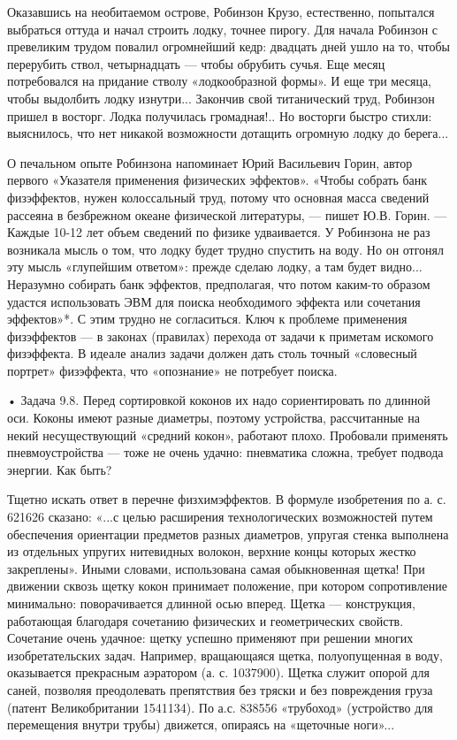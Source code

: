 Оказавшись  на  необитаемом   острове,  Робинзон  Крузо,  естественно,
попытался выбраться оттуда  и начал строить лодку,  точнее пирогу. Для
начала Робинзон с превеликим трудом повалил огромнейший кедр: двадцать
дней ушло на то, чтобы перерубить ствол, четырнадцать — чтобы обрубить
сучья.  Еще  месяц  потребовался  на  придание  стволу  «лодкообразной
формы». И  еще три месяца,  чтобы выдолбить лодку  изнутри... Закончив
свой титанический  труд, Робинзон  пришел в восторг.  Лодка получилась
громадная!.. Но  восторги быстро  стихли: выяснилось, что  нет никакой
возможности дотащить огромную лодку до берега...

О печальном  опыте Робинзона  напоминает Юрий Васильевич  Горин, автор
первого  «Указателя применения  физических  эффектов». «Чтобы  собрать
банк физэффектов,  нужен колоссальный труд, потому  что основная масса
сведений рассеяна  в безбрежном океане физической  литературы, — пишет
Ю.В. Горин. — Каждые 10-12 лет объем сведений по физике удваивается. У
Робинзона  не  раз возникала  мысль  о  том,  что лодку  будет  трудно
спустить на воду. Но он  отгонял эту мысль «глупейшим ответом»: прежде
сделаю лодку, а  там будет видно... Неразумно  собирать банк эффектов,
предполагая, что  потом каким-то образом удастся  использовать ЭВМ для
поиска необходимого эффекта или сочетания эффектов»*. С этим трудно не
согласиться.  Ключ  к  проблеме  применения физэффектов  —  в  законах
(правилах) перехода от задачи к приметам искомого физэффекта. В идеале
анализ задачи должен дать столь точный «словесный портрет» физэффекта,
что «опознание» не потребует поиска.


•  Задача  9.8.  Перед  сортировкой  коконов  их  надо  сориентировать
по  длинной оси.  Коконы  имеют разные  диаметры, поэтому  устройства,
рассчитанные  на   некий  несуществующий  «средний   кокон»,  работают
плохо. Пробовали  применять пневмоустройства  — тоже не  очень удачно:
пневматика сложна, требует подвода энергии. Как быть?

Тщетно искать  ответ в  перечне физхимэффектов. В  формуле изобретения
по  а.  с.  621626  сказано: «...с  целью  расширения  технологических
возможностей путем обеспечения  ориентации предметов разных диаметров,
упругая  стенка выполнена  из  отдельных  упругих нитевидных  волокон,
верхние концы которых жестко  закреплены». Иными словами, использована
самая обыкновенная  щетка! При  движении сквозь щетку  кокон принимает
положение,  при   котором  сопротивление   минимально:  поворачивается
длинной  осью  вперед.  Щетка   —  конструкция,  работающая  благодаря
сочетанию  физических   и  геометрических  свойств.   Сочетание  очень
удачное: щетку  успешно применяют при решении  многих изобретательских
задач. Например, вращающаяся щетка,  полуопущенная в воду, оказывается
прекрасным аэратором (а.  с. 1037900). Щетка служит  опорой для саней,
позволяя преодолевать  препятствия без тряски и  без повреждения груза
(патент Великобритании 1541134). По а.с. 838556 «трубоход» (устройство
для перемещения внутри трубы) движется, опираясь на «щеточные ноги»...


